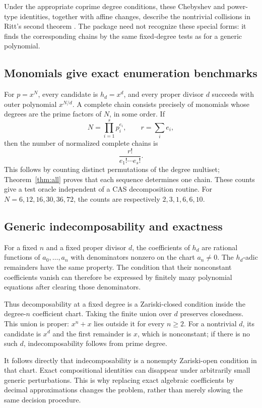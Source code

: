 \documentclass[11pt,letterpaper]{article}
\theoremstyle{definition}
\theoremstyle{remark}
\begin{document}
Under the appropriate coprime degree conditions, these Chebyshev and
power-type identities, together with affine changes, describe the
nontrivial collisions in Ritt's second theorem
\cite[Theorem 2.17]{zieve-mueller}. The package need not recognize these
special forms: it finds the corresponding chains by the same fixed-degree
tests as for a generic polynomial.

\subsection{Monomials give exact enumeration benchmarks}
For $p=x^N$, every candidate is $h_d=x^d$, and every proper divisor $d$
succeeds with outer polynomial $x^{N/d}$. A complete chain consists
precisely of monomials whose degrees are the prime factors of $N$, in
some order. If
\[
 N=\prod_{i=1}^s p_i^{e_i},\qquad r=\sum_i e_i,
\]
then the number of normalized complete chains is
\begin{equation}\label{eq:monocount}
 \frac{r!}{e_1!\cdots e_s!}.
\end{equation}
This follows by counting distinct permutations of the degree multiset;
Theorem~\ref{thm:all} proves that each sequence determines one chain.
These counts give a test oracle independent of a CAS decomposition
routine. For $N=6,12,16,30,36,72$, the counts are respectively
$2,3,1,6,6,10$.

\subsection{Generic indecomposability and exactness}
For a fixed $n$ and a fixed proper divisor $d$, the coefficients of
$h_d$ are rational functions of $a_0,\ldots,a_n$ with denominators
nonzero on the chart $a_n\ne0$. The $h_d$-adic remainders have the same
property. The condition that their nonconstant coefficients vanish can
therefore be expressed by finitely many polynomial equations after
clearing those denominators.

Thus decomposability at a fixed degree is a Zariski-closed condition
inside the degree-$n$ coefficient chart. Taking the finite union over
$d$ preserves closedness. This union is proper: $x^n+x$ lies outside it
for every $n\geq2$. For a nontrivial $d$, its candidate is $x^d$ and the
first remainder is $x$, which is nonconstant; if there is no such $d$,
indecomposability follows from prime degree.

It follows directly that indecomposability is a nonempty Zariski-open
condition in that chart. Exact compositional identities can disappear
under arbitrarily small generic perturbations. This is why replacing
exact algebraic coefficients by decimal approximations changes the
problem, rather than merely slowing the same decision procedure.
\end{document}
